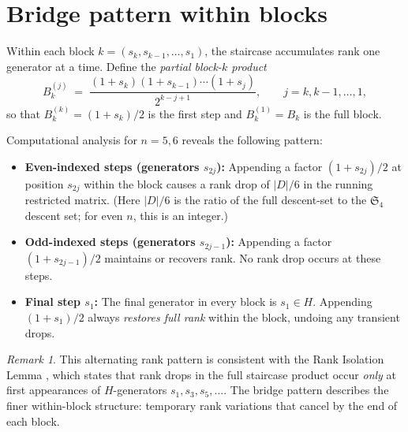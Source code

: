 \documentclass[11pt]{article}
\theoremstyle{definition}
\theoremstyle{remark}
\newtheorem{remark}[theorem]{Remark}
\newcommand{\Sym}{\mathfrak{S}}
\begin{document}
\section{Bridge pattern within blocks}

\label{sec:bridge}

Within each block $k = (s_k, s_{k-1}, \ldots, s_1)$, the staircase
accumulates rank one generator at a time.  Define the \emph{partial
block-$k$ product}
\[
  B_k^{(j)} \;=\; \frac{(1+s_k)(1+s_{k-1})\cdots(1+s_j)}{2^{k-j+1}},
  \qquad j = k, k-1, \ldots, 1,
\]
so that $B_k^{(k)} = (1+s_k)/2$ is the first step and
$B_k^{(1)} = B_k$ is the full block.

Computational analysis for $n = 5, 6$ reveals the following pattern:

\begin{itemize}

\item \textbf{Even-indexed steps (generators $s_{2j}$):}  Appending a
factor $(1+s_{2j})/2$ at position $s_{2j}$ within the block causes a
rank drop of $|D|/6$ in the running restricted matrix.  (Here
$|D|/6$ is the ratio of the full descent-set to the $\Sym_4$ descent
set; for even $n$, this is an integer.)

\item \textbf{Odd-indexed steps (generators $s_{2j-1}$):}  Appending
a factor $(1+s_{2j-1})/2$ maintains or recovers rank.  No rank drop
occurs at these steps.

\item \textbf{Final step $s_1$:}  The final generator in every block
is $s_1 \in H$.  Appending $(1+s_1)/2$ always \emph{restores full
rank} within the block, undoing any transient drops.

\end{itemize}

\begin{remark}
This alternating rank pattern is consistent with the Rank Isolation
Lemma \cite{Clio-RankIso}, which states that rank drops in the full
staircase product occur \emph{only} at first appearances of
$H$-generators $s_1, s_3, s_5, \ldots$.  The bridge pattern describes
the finer within-block structure: temporary rank variations that cancel
by the end of each block.
\end{remark}


\end{document}
